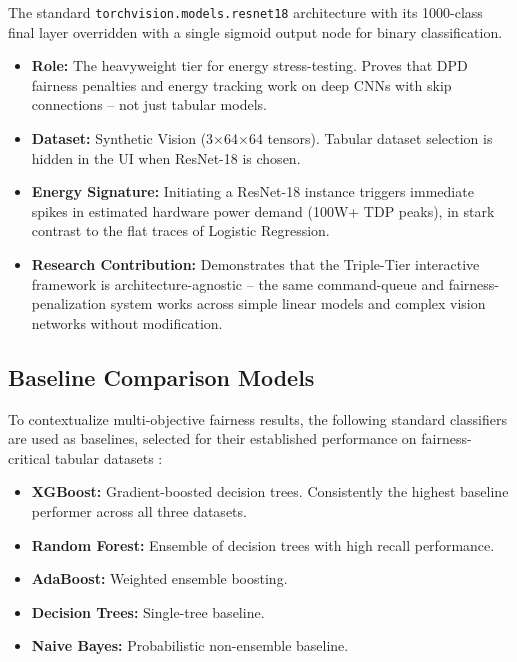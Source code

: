 \documentclass[12pt,a4paper]{article}
\begin{document}
The standard \texttt{torchvision.models.resnet18} architecture with its 1000-class final layer overridden with a single sigmoid output node for binary classification.

\begin{itemize}
    \item \textbf{Role:} The heavyweight tier for energy stress-testing. Proves that DPD fairness penalties and energy tracking work on deep CNNs with skip connections -- not just tabular models.
    \item \textbf{Dataset:} Synthetic Vision (3$\times$64$\times$64 tensors). Tabular dataset selection is hidden in the UI when ResNet-18 is chosen.
    \item \textbf{Energy Signature:} Initiating a ResNet-18 instance triggers immediate spikes in estimated hardware power demand (100W+ TDP peaks), in stark contrast to the flat traces of Logistic Regression.
    \item \textbf{Research Contribution:} Demonstrates that the Triple-Tier interactive framework is architecture-agnostic -- the same command-queue and fairness-penalization system works across simple linear models and complex vision networks without modification.
\end{itemize}

\subsection{Baseline Comparison Models}

To contextualize multi-objective fairness results, the following standard classifiers are used as baselines, selected for their established performance on fairness-critical tabular datasets \cite{rN2024multiobj}:

\begin{itemize}
    \item \textbf{XGBoost:} Gradient-boosted decision trees. Consistently the highest baseline performer across all three datasets.
    \item \textbf{Random Forest:} Ensemble of decision trees with high recall performance.
    \item \textbf{AdaBoost:} Weighted ensemble boosting.
    \item \textbf{Decision Trees:} Single-tree baseline.
    \item \textbf{Naive Bayes:} Probabilistic non-ensemble baseline.
\end{itemize}

\end{document}

